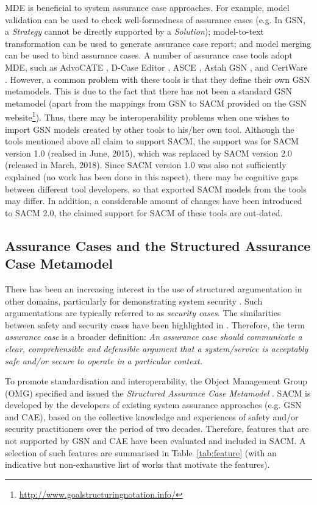 MDE is beneficial to system assurance case approaches.
For example, model validation can be used to check well-formedness of assurance cases (e.g. In GSN, a \textit{Strategy} cannot be directly supported by a \textit{Solution}); model-to-text transformation can be used to generate assurance case report; and model merging can be used to bind assurance cases. 
A number of assurance case tools adopt MDE, such as AdvoCATE \cite{denney2017tool}, D-Case Editor \cite{matsuno2010dependability}, ASCE \cite{netkachova2014tool}, Astah GSN \cite{larrucea2017supporting}, and CertWare \cite{barry2011certware}. 
However, a common problem with these tools is that they define their own GSN metamodels. 
This is due to the fact that there has not been a standard GSN metamodel (apart from the mappings from GSN to SACM provided on the GSN website\footnote{\url{http://www.goalstructuringnotation.info/}}). 
Thus, there may be interoperability problems when one wishes to import GSN models created by other tools to his/her own tool. 
Although the tools mentioned above all claim to support SACM, the support was for SACM version 1.0 (realsed in June, 2015), which was replaced by SACM version 2.0 (released in March, 2018).
Since SACM version 1.0 was also not sufficiently explained (no work has been done in this aspect), there may be cognitive gaps between different tool developers, so that exported SACM models from the tools may differ.
In addition, a considerable amount of changes have been introduced to SACM 2.0, the claimed support for SACM of these tools are out-dated. 

\subsection{Assurance Cases and the Structured Assurance Case Metamodel}
\label{sec:ac_sacm}
There has been an increasing interest in the use of structured argumentation in other domains, particularly for demonstrating system security \cite{bloomfield2010safety}. 
Such argumentations are typically referred to as \textit{security cases}. 
The similarities between safety and security cases have been highlighted in \cite{lautieri2005safsec}. 
Therefore, the term \textit{assurance case} is a broader definition: \textit{An assurance case should communicate a clear, comprehensible and defensible argument that a system/service is acceptably safe and/or secure to operate in a particular context.} 

To promote standardisation and interoperability, the Object Management Group (OMG) specified and issued the \textit{Structured Assurance Case Metamodel} \cite{sacm}. 
SACM is developed by the developers of existing system assurance approaches (e.g. GSN and CAE), based on the collective knowledge and experiences of safety and/or security practitioners over the period of two decades. 
Therefore, features that are not supported by GSN and CAE have been evaluated and included in SACM. 
A selection of such features are summarised in Table~\ref{tab:feature} (with an indicative but non-exhaustive list of works that motivate the features).

